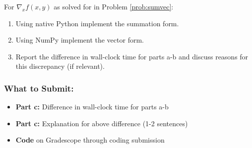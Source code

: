 \documentclass{article}
\begin{document}
\begin{aprob} \label{prob:sumvecimp}
    For $\nabla_x f(x,y)$ as solved for in Problem \ref{prob:sumvec}:
    \begin{enumerate}
        \item {} Using native Python implement the summation form.
        \item {} Using NumPy implement the vector form.
        \item {} Report the difference in wall-clock time for parts a-b and discuss reasons for this discrepancy (if relevant). 
    \end{enumerate}
    
    \subsubsection*{What to Submit:}
    \begin{itemize}
        \item \textbf{Part c:} Difference in wall-clock time for parts a-b
        \item \textbf{Part c:} Explanation for above difference (1-2 sentences)
        \item \textbf{Code} on Gradescope through coding submission
    \end{itemize}
\end{aprob}
\end{document}
